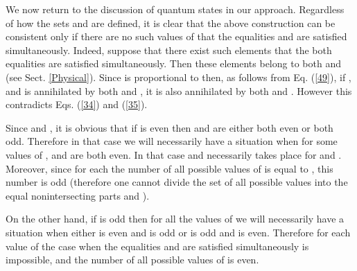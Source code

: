 \documentclass[a4paper,12pt]{article}%
\begin{document}
We now return to the discussion of quantum states in our
approach.
Regardless of how the sets \coordHE{} and \coordHE{} are
defined, it is clear that the above construction
can be consistent only if there are no such values
of \coordHE{} that the equalities \coordHE{}
and \coordHE{} are satisfied simultaneously.
Indeed, suppose that there exist such elements
\coordHE{} that the both equalities are satisfied
simultaneously. Then these elements belong to
both \coordHE{} and \coordHE{} (see Sect. \ref{Physical}).
Since \coordHE{} is proportional to
\coordHE{} then, as follows
from Eq. (\ref{49}), if \coordHE{}, 
\coordHE{} and \coordHE{}
is annihilated by both \coordHE{} and 
\coordHE{}, it is also annihilated by both
\coordHE{} and \coordHE{}. However this
contradicts Eqs. (\ref{34}) and (\ref{35}).   

Since \coordHE{} and \coordHE{}, it is
obvious that if \coordHE{} is even then \coordHE{} and \coordHE{}
are either both even or both odd. Therefore in that
case we will necessarily have a situation when for
some values of \coordHE{}, \coordHE{} and \coordHE{}
are both even. In that case \coordHE{}
and \coordHE{} necessarily takes place for 
\coordHE{} and \coordHE{}. Moreover, since 
for each \coordHE{} the number of all possible values of 
\coordHE{}
is equal to \coordHE{}, this 
number is odd (therefore one cannot divide the set
of all possible values into the equal 
nonintersecting parts \coordHE{} and \coordHE{}). 

On the other hand, if \coordHE{} is odd then
for all the values of \coordHE{} we will necessarily have
a situation when either \coordHE{} is even and
\coordHE{} is odd or \coordHE{} is odd and
\coordHE{} is even. Therefore for each value of 
\coordHE{} the case when the equalities \coordHE{}
and \coordHE{} are satisfied simultaneously
is impossible, 
and the number of all possible values of \coordHE{}  
is even.
\end{document}
